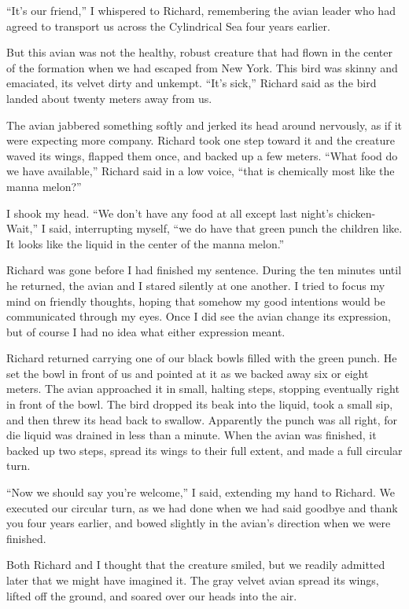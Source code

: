 \documentclass[]{article}
\begin{document}
“It’s our friend,” I whispered to Richard, remembering the avian leader who had agreed to transport us across the Cylindrical Sea four years earlier.

But this avian was not the healthy, robust creature that had flown in the center of the formation when we had escaped from New York.  This bird was skinny and emaciated, its velvet dirty and unkempt.  “It’s sick,” Richard said as the bird landed about twenty meters away from us.

The avian jabbered something softly and jerked its head around nervously, as if it were expecting more company.  Richard took one step toward it and the creature waved its wings, flapped them once, and backed up a few meters.  “What food do we have available,” Richard said in a low voice, “that is chemically most like the manna melon?”

I shook my head.  “We don’t have any food at all except last night’s chicken-Wait,” I said, interrupting myself, “we do have that green punch the children like.  It looks like the liquid in the center of the manna melon.”

Richard was gone before I had finished my sentence.  During the ten minutes until he returned, the avian and I stared silently at one another.  I tried to focus my mind on friendly thoughts, hoping that somehow my good intentions would be communicated through my eyes.  Once I did see the avian change its expression, but of course I had no idea what either expression meant.

Richard returned carrying one of our black bowls filled with the green punch.  He set the bowl in front of us and pointed at it as we backed away six or eight meters.  The avian approached it in small, halting steps, stopping eventually right in front of the bowl.  The bird dropped its beak into the liquid, took a small sip, and then threw its head back to swallow.  Apparently the punch was all right, for die liquid was drained in less than a minute.  When the avian was finished, it backed up two steps, spread its wings to their full extent, and made a full circular turn.

“Now we should say you’re welcome,” I said, extending my hand to Richard.  We executed our circular turn, as we had done when we had said goodbye and thank you four years earlier, and bowed slightly in the avian’s direction when we were finished.

Both Richard and I thought that the creature smiled, but we readily admitted later that we might have imagined it.  The gray velvet avian spread its wings, lifted off the ground, and soared over our heads into the air.
\end{document}
